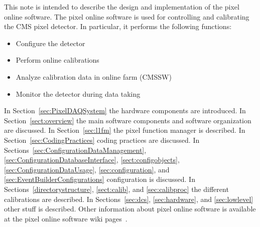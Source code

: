 
This note is intended to describe the design and implementation of the
pixel online software. The pixel online software is used for controlling and calibrating the CMS pixel
detector. In particular, it performs the following functions:
\begin{itemize}
\item Configure the detector
\item Perform online calibrations
\item Analyze calibration data in online farm (CMSSW)
\item Monitor the detector during data taking
\end{itemize}

In Section~\ref{sec:PixelDAQSystem} the hardware components are introduced.
In Section~\ref{sect:overview} the main software components and software organization are discussed.
In Section~\ref{sec:l1fm} the pixel function manager is described.
In Section~\ref{sec:CodingPractices} coding practices are discussed.
In Sections~\ref{sec:ConfigurationDataManagement}, \ref{sec:ConfigurationDatabaseInterface}, \ref{sect:configobjects}, \ref{sec:ConfigurationDataUsage}, \ref{sec:configuration}, and \ref{sec:EventBuilderConfigurations} configuration is discussed.
In Sections~\ref{directorystructure}, \ref{sect:calib}, and \ref{sec:calibproc} the different calibrations are described.
In Sections~\ref{sec:dcs}, \ref{sec:hardware}, and \ref{sec:lowlevel} other stuff is described.
Other information about pixel online software is available at the pixel online software wiki pages~\cite{poswiki}.

